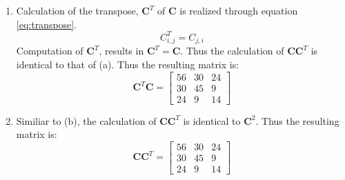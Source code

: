\begin{enumerate}
\item Calculation of the transpose, $\boldsymbol{C}^T$ of $\boldsymbol{C}$ is realized through equation \ref{eq:transpose}.
\begin{equation}
	C^T_{i,j}=C_{j,i}
	\label{eq:transpose}
\end{equation}
Computation of $\boldsymbol{C}^T$, results in $\boldsymbol{C}^T=\boldsymbol{C}$. Thus the calculation of $\boldsymbol{C}\boldsymbol{C}^T$ is identical to that of (a). Thus the resulting matrix is:
\begin{equation*}
\boxed{
\boldsymbol{C}^T\boldsymbol{C}=
\begin{bmatrix}
	56 &30&24\\30&45&9\\24&9&14
\end{bmatrix}}
\end{equation*}
\item Similiar to (b), the calculation of $\boldsymbol{C}\boldsymbol{C}^T$ is identical to $\boldsymbol{C}^2$. Thus the resulting matrix is:
\begin{equation*}
\boxed{
\boldsymbol{C}\boldsymbol{C}^T=
\begin{bmatrix}
	56 &30&24\\30&45&9\\24&9&14
\end{bmatrix}}
\end{equation*}
\end{enumerate}
	
